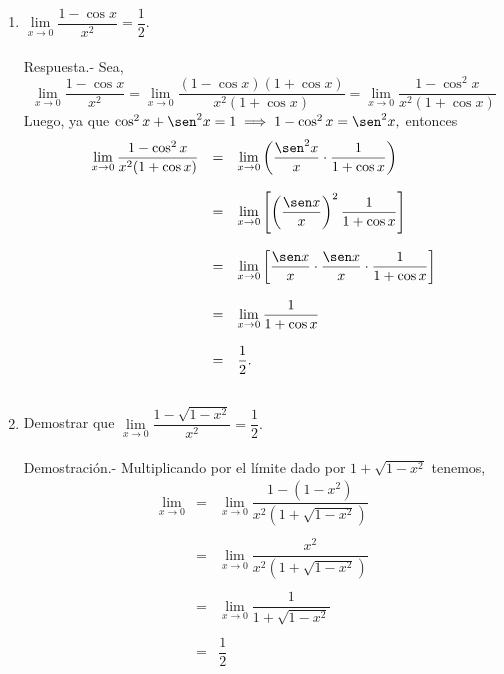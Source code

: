 \begin{enumerate}[\bfseries 1.]
    \item $\lim\limits_{x\to 0}\dfrac{1-\cos x}{x^2}=\dfrac{1}{2}.$\\\\
	Respuesta.-\; Sea,
	$$\lim_{x\to 0}\dfrac{1-\cos x}{x^2}=\lim_{x\to 0} \dfrac{(1-\cos x)(1+\cos x)}{x^2(1+\cos x)}=\lim_{x\to 0}\dfrac{1-\cos^2 x}{x^2(1+\cos x)}$$
	Luego, ya que $\cos^2x+\sen^2 x = 1 \; \Longrightarrow \; 1-\cos^2x = \sen^2x,$ entonces
	$$\begin{array}{rcl}
	    \lim\limits_{x\to 0}\dfrac{1-\cos^2 x}{x^2(1+\cos x)}&=&\lim\limits_{x\to 0}\left(\dfrac{\sen^2 x}{x}\cdot \dfrac{1}{1+\cos x}\right)\\\\
								 &=&\lim\limits_{x\to 0}\left[\left(\dfrac{\sen x}{x}\right)^2 \dfrac{1}{1+\cos x}\right]\\\\
								 &=&\lim\limits_{x\to 0}\left[\dfrac{\sen x}{x}\cdot \dfrac{\sen x}{x}\cdot \dfrac{1}{1+\cos x}\right]\\\\
								 &=&\lim\limits_{x\to 0}\dfrac{1}{1+\cos x}\\\\
								 &=&\dfrac{1}{2}.\\\\


	\end{array}$$

    \item Demostrar que $\lim\limits_{x\to 0}\dfrac{1-\sqrt{1-x^2}}{x^2}=\dfrac{1}{2}.$\\\\
	Demostración.-\; Multiplicando por el límite dado por $1+\sqrt{1-x^2}$ tenemos,
	$$\begin{array}{rcl}
	    \lim\limits_{x\to 0}&=&\lim\limits_{x\to 0}\dfrac{1-(1-x^2)}{x^2(1+\sqrt{1-x^2})}\\\\
				&=&\lim\limits_{x\to 0}\dfrac{x^2}{x^2(1+\sqrt{1-x^2})}\\\\
				&=&\lim\limits_{x\to 0}\dfrac{1}{1+\sqrt{1-x^2}}\\\\
				&=&\dfrac{1}{2}\\\\\
	\end{array}$$


\end{enumerate}
